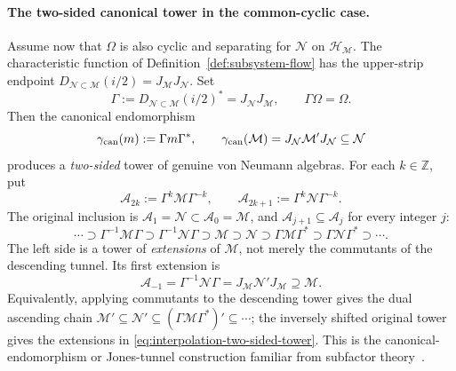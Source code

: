 \documentclass[a4paper,11pt]{article}
\theoremstyle{definition}
\newcommand{\mA}{\mathcal{A}}
\newcommand{\mN}{\mathcal{N}}
\newcommand{\mH}{\mathcal{H}}
\newcommand{\mM}{\mathcal{M}}
\begin{document}
\paragraph{The two-sided canonical tower in the common-cyclic case.}
Assume now that $\Omega$ is also cyclic and separating for $\mN$
on $\mH_{\mM}$. The characteristic function of
Definition~\ref{def:subsystem-flow} has the upper-strip endpoint
$D_{\mN\subset\mM}(i/2)=J_{\mM}J_{\mN}$. Set
\begin{equation}
 \Gamma:=D_{\mN\subset\mM}(i/2)^*
 =J_{\mN}J_{\mM},\qquad \Gamma\Omega=\Omega.
 \label{eq:interpolation-Gamma}
\end{equation}
Then the canonical endomorphism
\begin{equation}
 \gamma_{\rm can}(m):=\Gamma m\Gamma^*,\qquad
 \gamma_{\rm can}(\mM)=J_{\mN}\mM'J_{\mN}\subseteq\mN
 \label{eq:interpolation-canonical-endomorphism}
\end{equation}
produces a \emph{two-sided} tower of genuine von Neumann algebras.
For each $k\in\mathbb Z$, put
\begin{equation}
 \mA_{2k}:=\Gamma^k\mM\Gamma^{-k},\qquad
 \mA_{2k+1}:=\Gamma^k\mN\Gamma^{-k}.
 \label{eq:interpolation-tower-levels}
\end{equation}
The original inclusion is $\mA_1=\mN\subset\mA_0=\mM$,
and $\mA_{j+1}\subseteq\mA_j$ for every integer $j$:
\begin{equation}
 \boxed{\quad
 \cdots\supset\Gamma^{-1}\mM\Gamma
 \supset\Gamma^{-1}\mN\Gamma
 \supset\mM\supset\mN
 \supset\Gamma\mM\Gamma^*\supset\Gamma\mN\Gamma^*
 \supset\cdots .\quad}
 \label{eq:interpolation-two-sided-tower}
\end{equation}
The left side is a tower of \emph{extensions} of $\mM$,
not merely the commutants of the descending tunnel. Its first extension
is
\begin{equation}
 \mA_{-1}=\Gamma^{-1}\mN\Gamma
 =J_{\mM}\mN'J_{\mM}\supseteq\mM.
 \label{eq:interpolation-first-extension}
\end{equation}
Equivalently, applying commutants to the descending tower gives the
dual ascending chain
$\mM'\subseteq\mN'\subseteq(\Gamma\mM\Gamma^*)'
\subseteq\cdots$; the inversely shifted original tower gives the
extensions in \eqref{eq:interpolation-two-sided-tower}. This is the
canonical-endomorphism or Jones-tunnel construction familiar from
subfactor theory~\cite{revolutionizing,GuidoLongoWiesbrock1998}.
\end{document}
